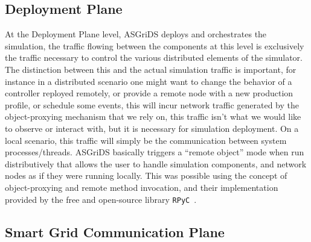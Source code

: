 \documentclass[conference]{IEEEtran}
\begin{document}
\subsection{Deployment Plane}

At the Deployment Plane level, ASGriDS deploys and orchestrates the simulation, the traffic flowing between the components at this level is exclusively the traffic necessary to control the various distributed elements of the simulator. The distinction between this and the actual simulation traffic is important, for instance in a distributed scenario one might want to change the behavior of a controller reployed remotely, or provide a remote node with a new production profile, or schedule some events, this will incur network traffic generated by the object-proxying mechanism that we rely on, this traffic isn't what we would like to observe or interact with, but it is necessary for simulation deployment. On a local scenario, this traffic will simply be the communication between system processes/threads.
ASGriDS basically triggers a ``remote object'' mode when run distributively that allows the user to handle simulation components, and network nodes as if they were running locally. This was possible using the concept of object-proxying and remote method invocation, and their implementation provided by the free and open-source library \texttt{RPyC}~\cite{RPyCTransparentSymmetric}. 


\subsection{Smart Grid Communication Plane}\label{sgcomm_plane}
\end{document}
